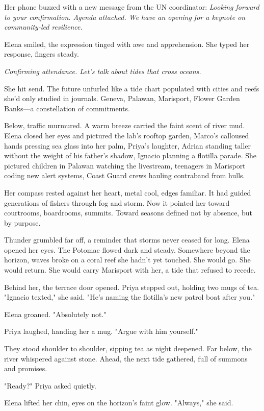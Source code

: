 Her phone buzzed with a new message from the UN coordinator: \textit{Looking forward to your confirmation. Agenda attached. We have an opening for a keynote on community-led resilience.}

Elena smiled, the expression tinged with awe and apprehension. She typed her response, fingers steady.

\textit{Confirming attendance. Let's talk about tides that cross oceans.}

She hit send. The future unfurled like a tide chart populated with cities and reefs she'd only studied in journals. Geneva, Palawan, Marisport, Flower Garden Banks—a constellation of commitments.

Below, traffic murmured. A warm breeze carried the faint scent of river mud. Elena closed her eyes and pictured the lab's rooftop garden, Marco's calloused hands pressing sea glass into her palm, Priya's laughter, Adrian standing taller without the weight of his father's shadow, Ignacio planning a flotilla parade. She pictured children in Palawan watching the livestream, teenagers in Marisport coding new alert systems, Coast Guard crews hauling contraband from hulls.

Her compass rested against her heart, metal cool, edges familiar. It had guided generations of fishers through fog and storm. Now it pointed her toward courtrooms, boardrooms, summits. Toward seasons defined not by absence, but by purpose.

Thunder grumbled far off, a reminder that storms never ceased for long. Elena opened her eyes. The Potomac flowed dark and steady. Somewhere beyond the horizon, waves broke on a coral reef she hadn't yet touched. She would go. She would return. She would carry Marisport with her, a tide that refused to recede.

Behind her, the terrace door opened. Priya stepped out, holding two mugs of tea. "Ignacio texted," she said. "He's naming the flotilla's new patrol boat after you."

Elena groaned. "Absolutely not."

Priya laughed, handing her a mug. "Argue with him yourself."

They stood shoulder to shoulder, sipping tea as night deepened. Far below, the river whispered against stone. Ahead, the next tide gathered, full of summons and promises.

"Ready?" Priya asked quietly.

Elena lifted her chin, eyes on the horizon's faint glow. "Always," she said.

